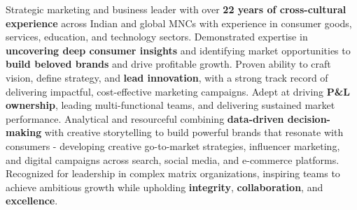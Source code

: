 
\par{
Strategic marketing and business leader with over \textbf{22 years of cross-cultural experience} across Indian and global MNCs with experience in consumer goods, services, education, and technology sectors. Demonstrated expertise in \textbf{uncovering deep consumer insights} and identifying market opportunities to \textbf{build beloved brands} and drive profitable growth. Proven ability to craft vision, define strategy, and \textbf{lead innovation}, with a strong track record of delivering impactful, cost-effective marketing campaigns. Adept at driving \textbf{P\&L ownership}, leading multi-functional teams, and delivering sustained market performance. Analytical and resourceful combining \textbf{data-driven decision-making} with creative storytelling to build powerful brands that resonate with consumers - developing creative go-to-market strategies, influencer marketing, and digital campaigns across search, social media, and e-commerce platforms. Recognized for leadership in complex matrix organizations, inspiring teams to achieve ambitious growth while upholding \textbf{integrity}, \textbf{collaboration}, and \textbf{excellence}.
}